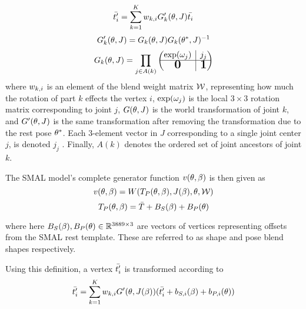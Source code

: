\begin{equation}
    \bar{t'_{i}} = \sum_{k=1}^{K} w_{k,i} G_{k}'(\theta,J)\bar{t_{i}}
\end{equation}
\begin{equation}
    G'_{k}(\theta,J) = G_{k}(\theta,J) G_{k}(\theta^{*},J)^{-1}
\end{equation}
\begin{equation}\label{eqt:kintree_prods}
    G_{k}(\pose,\smalrestJ) = \prod_{j \in A(k)} 
    \begin{pmatrix}
        \exp(\poseele{j})
        & \rvline 
        & j_{j} \\
    \hline
        \bigzero
        & \rvline 
        & \bigone
    \end{pmatrix}
\end{equation}
where $w_{k,i}$ is an element of the blend weight matrix $\mathcal{W}$, representing how much the rotation of part $k$ effects the vertex $i$, $\exp(\omega_{j})$ is the local $3 \times 3$ rotation matrix corresponding to joint $j$, $G(\theta,J)$ is the world transformation of joint $k$, and $G'(\theta,J)$ is the same transformation after removing the transformation due to the rest pose $\theta^{*}$. Each $3$-element vector in $J$ corresponding to a single joint center $j$, is denoted $j_{j}$ . Finally, $A(k)$ denotes the ordered set of joint ancestors of joint $k$.

The SMAL model's complete generator function $v(\theta, \beta)$ is then given as 
\begin{equation}
    v(\theta,\beta) = W(T_{P}(\theta, \beta), J(\beta), \theta, \mathcal{W})
\end{equation}
\begin{equation}
    T_{P}(\theta,\beta) = \bar{T} + B_{S}(\beta) + B_{P}(\theta)
\end{equation}

where here $B_{S}(\beta), B_{P}(\theta) \in {\mathbb{R}^{3889 \times 3}}$ are vectors of vertices representing offsets from the SMAL rest template. These are referred to as shape and pose blend shapes respectively.

Using this definition, a vertex $\bar{t'_{i}}$ is transformed according to 
\begin{equation}
    \bar{t'_{i}} = \sum_{k=1}^{K} w_{k,i} G'(\theta,J(\beta))(\bar{t'_{i}} + b_{S,i}(\beta) + b_{P,i}(\theta))
\end{equation}

